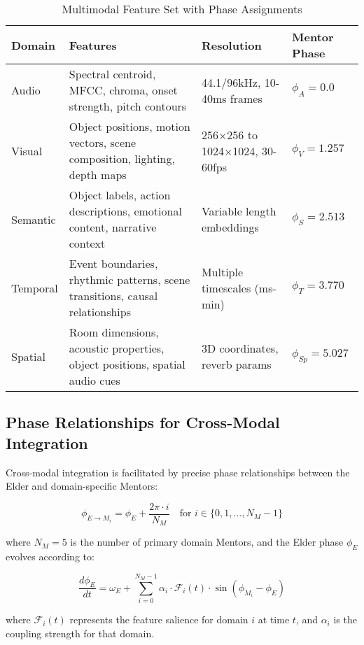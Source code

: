 \begin{table}[h]
\centering
\small
\begin{tabular}{|l|p{5.5cm}|l|l|}
\hline
\textbf{Domain} & \textbf{Features} & \textbf{Resolution} & \textbf{Mentor Phase} \\
\hline
Audio & Spectral centroid, MFCC, chroma, onset strength, pitch contours & 44.1/96kHz, 10-40ms frames & $\phi_A = 0.0$ \\
\hline
Visual & Object positions, motion vectors, scene composition, lighting, depth maps & 256×256 to 1024×1024, 30-60fps & $\phi_V = 1.257$ \\
\hline
Semantic & Object labels, action descriptions, emotional content, narrative context & Variable length embeddings & $\phi_S = 2.513$ \\
\hline
Temporal & Event boundaries, rhythmic patterns, scene transitions, causal relationships & Multiple timescales (ms-min) & $\phi_T = 3.770$ \\
\hline
Spatial & Room dimensions, acoustic properties, object positions, spatial audio cues & 3D coordinates, reverb params & $\phi_{Sp} = 5.027$ \\
\hline
\end{tabular}
\caption{Multimodal Feature Set with Phase Assignments}
\end{table}

\subsection{Phase Relationships for Cross-Modal Integration}

Cross-modal integration is facilitated by precise phase relationships between the Elder and domain-specific Mentors:

\begin{equation}
\phi_{E \to M_i} = \phi_E + \frac{2\pi \cdot i}{N_M} \quad \text{for } i \in \{0,1,\ldots,N_M-1\}
\end{equation}

where $N_M = 5$ is the number of primary domain Mentors, and the Elder phase $\phi_E$ evolves according to:

\begin{equation}
\frac{d\phi_E}{dt} = \omega_E + \sum_{i=0}^{N_M-1} \alpha_i \cdot \mathcal{F}_i(t) \cdot \sin(\phi_{M_i} - \phi_E)
\end{equation}

where $\mathcal{F}_i(t)$ represents the feature salience for domain $i$ at time $t$, and $\alpha_i$ is the coupling strength for that domain.

